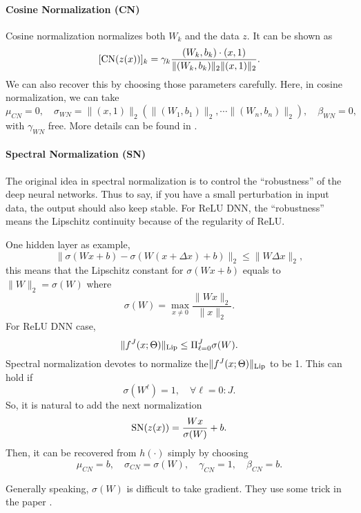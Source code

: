 \paragraph{Cosine Normalization (CN)}
Cosine normalization normalizes both $W_k$ and the data $z$. 
It can be shown as
$$
[{\rm CN}(z(x)) ]_k= \gamma_k \frac{(W_k, b_k) \cdot (x,1) }{\|(W_k,b_k)\|_{2} \|(x,1)\|_{2}}.
$$
We can also recover this by choosing those parameters carefully.
Here, in cosine normalization, we can take 
\begin{equation}
\mu_{CN} = 0,\quad  \sigma_{WN} =  \|(x,1)\|_{2}\left(\|(W_1,b_1)\|_{2}, \cdots \|(W_n,b_n)\|_{2}\right),\quad \beta_{WN} = 0,
\end{equation}
with $\gamma_{WN}$ free.
More details can be found in \cite{luo2018cosine}.

\paragraph{Spectral Normalization (SN)}
The original idea in spectral normalization is to control the ``robustness'' of the deep neural networks.
Thus to say, if you have a small perturbation in input data, the output should 
also keep stable.
For ReLU DNN, the ``robustness'' means the Lipschitz  continuity because of the regularity of ReLU.

One hidden layer as example, 
\begin{equation}
\| \sigma(Wx + b) - \sigma(W(x+\Delta x) + b)\|_2 \le \|W\Delta x\|_2,
\end{equation}
this means that the Lipschitz constant for $\sigma(Wx+b)$ equals to $\|W\|_2 = \sigma (W)$ where
\begin{equation}
\sigma(W)=\max_{x\neq0}\frac{\|Wx\|_2}{\|x\|_2}.
\end{equation}
For ReLU DNN case,
$$
\|f^J(x;\Theta)\|_{\rm Lip} \le \Pi_{\ell=0}^J \sigma(W).
$$
Spectral normalization devotes to normalize the$ \|f^J(x;\Theta)\|_{\rm Lip} $ to be 1.
This can hold if 
$$
\sigma (W^\ell) = 1, \quad \forall \ell = 0:J.
$$
So, it is natural to add the next normalization 
$$
{\rm SN}(z(x)) = \frac{ Wx }{\sigma(W)} + b.
$$
Then, it can be recovered from $h(\cdot)$ simply by choosing
\begin{equation}
\mu_{CN} = b,\quad  \sigma_{CN} =  \sigma(W),\quad \gamma_{CN} = 1, \quad \beta_{CN} = b.
\end{equation}

\begin{remark}
Generally speaking, $\sigma (W)$ is difficult to take gradient. They use some trick in the paper \cite{miyato2018spectral}.
\end{remark}


